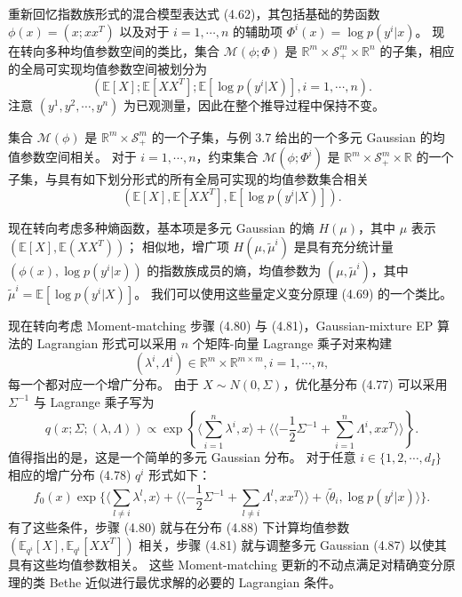 \begin{tcolorbox}
\begin{exam}
    重新回忆指数族形式的混合模型表达式 (4.62)，其包括基础的势函数 $\phi(x) = (x; xx^T)$ 以及对于 $i = 1, \cdots, n$ 的辅助项 $\Phi^i(x) = \log p(y^i|x)$。
    现在转向多种均值参数空间的类比，集合 $\mathcal{M}(\phi; \Phi)$ 是 $\mathbb{R}^m \times \mathcal{S}_+^m \times \mathbb{R}^n$ 的子集，相应的全局可实现均值参数空间被划分为
    \begin{equation*}
        (\mathbb{E}[X]; \mathbb{E}[XX^T]; \mathbb{E}[\log p(y^i|X)], i = 1, \cdots, n).
    \end{equation*}
    注意 $(y^1, y^2, \cdots, y^n)$ 为已观测量，因此在整个推导过程中保持不变。

    集合 $\mathcal{M}(\phi)$ 是 $\mathbb{R}^m\times\mathcal{S}_+^m$ 的一个子集，与例 3.7 给出的一个多元 Gaussian 的均值参数空间相关。
    对于 $i = 1, \cdots, n$，约束集合 $\mathcal{M}(\phi; \Phi^i)$ 是 $\mathbb{R}^m\times\mathcal{S}_+^m\times\mathbb{R}$ 的一个子集，与具有如下划分形式的所有全局可实现的均值参数集合相关
    \begin{equation*}
        (\mathbb{E}[X], \mathbb{E}[XX^T], \mathbb{E}[\log p(y^i|X)]).
    \end{equation*}

    现在转向考虑多种熵函数，基本项是多元 Gaussian 的熵 $H(\mu)$，其中 $\mu$ 表示 $(\mathbb{E}[X], \mathbb{E}(XX^T))$；
    相似地，增广项 $H(\mu, \tilde{\mu}^i)$ 是具有充分统计量 $(\phi(x), \log p(y^i|x))$ 的指数族成员的熵，均值参数为 $(\mu, \tilde{\mu}^i)$，其中 $\tilde{\mu}^i = \mathbb{E}[\log p(y^i|X)]$。
    我们可以使用这些量定义变分原理 (4.69) 的一个类比。

    现在转向考虑 Moment-matching 步骤 (4.80) 与 (4.81)，Gaussian-mixture EP 算法的 Lagrangian 形式可以采用 $n$ 个矩阵-向量 Lagrange 乘子对来构建
    \begin{equation*}
        (\lambda^i, \Lambda^i) \in \mathbb{R}^m \times \mathbb{R}^{m \times m}, i = 1, \cdots, n,
    \end{equation*}
    每一个都对应一个增广分布。
    由于 $X \sim N(0, \Sigma)$，优化基分布 (4.77) 可以采用 $\Sigma^{-1}$ 与 Lagrange 乘子写为
    \begin{equation}
        q(x; \Sigma; (\lambda, \Lambda)) \propto \exp\left\{\langle\sum_{i = 1}^n\lambda^i, x\rangle+\langle\langle-\frac{1}{2}\Sigma^{-1}+\sum_{i = 1}^n\Lambda^i, xx^T\rangle\rangle\right\}.
    \end{equation}
    值得指出的是，这是一个简单的多元 Gaussian 分布。
    对于任意 $i \in \{1, 2, \cdots, d_I\}$ 相应的增广分布 (4.78) $q^i$ 形式如下：
    \begin{equation}
        f_0(x)\exp\{\langle\sum_{l \neq i}\lambda^l, x\rangle+\langle\langle-\frac{1}{2}\Sigma^{-1}+\sum_{l \neq i}\Lambda^l, xx^T\rangle\rangle+\langle\tilde{\theta}_i, \log p(y^i|x)\rangle\}.
    \end{equation}
    有了这些条件，步骤 (4.80) 就与在分布 (4.88) 下计算均值参数 $(\mathbb{E}_{q^i}[X], \mathbb{E}_{q^i}[XX^T])$ 相关，步骤 (4.81) 就与调整多元 Gaussian (4.87) 以使其具有这些均值参数相关。
    这些 Moment-matching 更新的不动点满足对精确变分原理的类 Bethe 近似进行最优求解的必要的 Lagrangian 条件。


\end{exam}
\end{tcolorbox}
